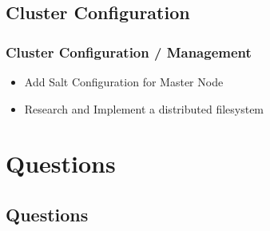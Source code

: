 \documentclass{beamer}
\begin{document}
\subsection{Cluster Configuration}
\begin{frame}
\frametitle{Cluster Configuration / Management}
\begin{itemize}
\item{Add Salt Configuration for Master Node}
\item{Research and Implement a distributed filesystem}
\end{itemize}
\end{frame}

\section*{Questions}
\subsection*{Questions}
\end{document}
